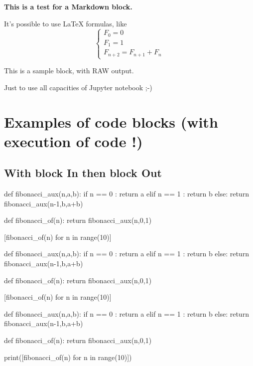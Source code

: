 \documentclass[a4paper,11pt]{article}
\begin{document}
\begin{NotebookPitonMarkdown}{\linewidth}
{\Large\bfseries This is a test for a \textsf{Markdown} block.}

It's possible to use \LaTeX{} formulas, like %
\[
\left\lbrace\begin{array}{l}
F_0 = 0\\
F_1 = 1 \\
F_{n+2} = F_{n+1} + F_n
\end{array}\right.
\]
\end{NotebookPitonMarkdown}

\begin{NotebookPitonRaw}{\linewidth}
This is a sample block, with RAW output.

Just to use all capacities of Jupyter notebook ;-)
\end{NotebookPitonRaw}

\section{Examples of code blocks (with execution of code !)}

\subsection{With block In then block Out}

\begin{codehigh}
\begin{NotebookPitonIn}{0.75\linewidth}
def fibonacci_aux(n,a,b):
  if n == 0 :
    return a
  elif n == 1 :
    return b
  else:
    return fibonacci_aux(n-1,b,a+b)

def fibonacci_of(n):
  return fibonacci_aux(n,0,1)

[fibonacci_of(n) for n in range(10)]
\end{NotebookPitonIn}
\end{codehigh}

\begin{NotebookPitonIn}{0.75\linewidth}
def fibonacci_aux(n,a,b):
	if n == 0 :
		return a
	elif n == 1 :
		return b
	else:
		return fibonacci_aux(n-1,b,a+b)

def fibonacci_of(n):
	return fibonacci_aux(n,0,1)

[fibonacci_of(n) for n in range(10)]
\end{NotebookPitonIn}

\begin{codehigh}
\begin{NotebookPitonOut}{0.75\linewidth}
def fibonacci_aux(n,a,b):
  if n == 0 :
    return a
  elif n == 1 :
    return b
  else:
    return fibonacci_aux(n-1,b,a+b)

def fibonacci_of(n):
  return fibonacci_aux(n,0,1)

print([fibonacci_of(n) for n in range(10)])
\end{NotebookPitonOut}
\end{codehigh}
\end{document}
